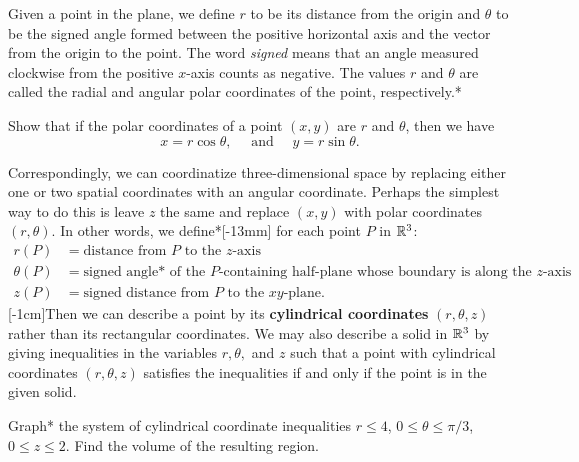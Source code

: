 \documentclass[prettycode,shellescape]{watsonbook}
\begin{document}
Given a point in the plane, we define $r$ to be its distance from the
origin and $\theta$ to be the signed angle formed between the positive
horizontal axis and the vector from the origin to the point. The word
\textit{signed} means that an angle measured clockwise from the
positive $x$-axis counts as negative. The values $r$ and $\theta$ are
called the radial and angular polar coordinates of the point,
respectively.* 

\begin{exercise}{}{}
  Show that if the polar coordinates of a point $(x,y)$ are $r$ and
  $\theta$, then we have
  \[
    x = r\cos \theta, \quad \text { and } \quad y  = r\sin \theta. 
  \]
\end{exercise}

Correspondingly, we can coordinatize three-dimensional space by
replacing either one or two spatial coordinates with an angular
coordinate. Perhaps the simplest way to do this is leave $z$ the same
and replace $(x,y)$ with polar coordinates $(r,\theta)$. In other
words, we define*[-13mm] for each point
$P$ in $\mathbb{R}^3$:
\begin{align*}
  r(P) &= \text{distance from $P$ to the }z\text{-axis} \\
  \theta(P) &= \text{signed angle* of the $P$-containing half-plane
              whose boundary is along the $z$-axis} \\ 
  z(P) &= \text{signed distance from $P$ to the }xy\text{-plane}. 
\end{align*} [-1cm]Then we can describe a point by its
\textbf{cylindrical coordinates} $(r,\theta, z)$ rather than its
rectangular coordinates. We may also describe a solid in $\mathbb{R}^3$
by giving inequalities in the variables $r, \theta,$ and $z$ such that
a point with cylindrical coordinates
$(r,\theta,z)$
satisfies the inequalities if and only if the point is in the given solid. 

\begin{example}{}{}
  Graph* the system of cylindrical coordinate inequalities $r \leq 4$,
  \quad $0 \leq \theta \leq \pi/3$, \quad $0 \leq z \leq 2$. Find the
  volume of the resulting region. 
\end{example}
\end{document}
